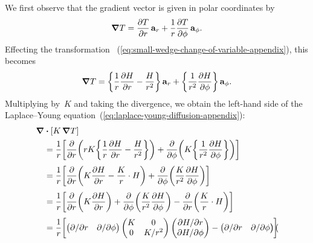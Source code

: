 We first observe that the gradient vector
is given in polar coordinates by
\begin{equation}
  \del T =
    \pder{T}{r} \basisvec{r} + \frac{1}{r} \pder{T}{\phi} \basisvec{\phi}.
  \label{eq:gradient-polar}
\end{equation}
Effecting the transformation~%
  (\ref{eq:small-wedge-change-of-variable-appendix}),
this becomes
\begin{equation}
  \del T =
    \curlybr*{\frac{1}{r} \pder{H}{r} - \frac{H}{r^2}} \basisvec{r}
      +
    \curlybr*{\frac{1}{r^2} \pder{H}{\phi}} \basisvec{\phi}.
  \label{eq:gradient-polar-change-of-variable}
\end{equation}
Multiplying by~$K$ and taking the divergence,
we obtain the left-hand side
of the Laplace--Young equation~(\ref{eq:laplace-young-diffusion-appendix}):
\begin{align*}
  \del & \dotp \squarebr{K \del T} \\
  &=
    \frac{1}{r} \squarebr*{
      \pder{}{r} \roundbr*{
        r K \curlybr*{\frac{1}{r} \pder{H}{r} - \frac{H}{r^2}}
      }
        +
      \pder{}{\phi} \roundbr*{
        K \curlybr*{\frac{1}{r^2} \pder{H}{\phi}}
      }
    }
    \\[\tallspace]
  &=
    \frac{1}{r} \squarebr*{
      \pder{}{r} \roundbr*{K \pder{H}{r} - \frac{K}{r} \cdot H}
        +
      \pder{}{\phi} \roundbr*{\frac{K}{r^2} \pder{H}{\phi}}
    }
    \\[\tallspace]
  &=
    \frac{1}{r} \squarebr*{
      \pder{}{r} \roundbr*{K \pder{H}{r}}
        +
      \pder{}{\phi} \roundbr*{\frac{K}{r^2} \pder{H}{\phi}}
        -
      \pder{}{r} \roundbr*{\frac{K}{r} \cdot H}
    }
    \\[\tallspace]
  &=
    \frac{1}{r} \squarebr*{
      \begin{pmatrix}
        \pd / {\pd r} & \pd / {\pd\phi}
      \end{pmatrix}
      \begin{pmatrix}
        K  &  0 \\
        0  &  K / r^2
      \end{pmatrix}
      \begin{pmatrix}
        \pd H / {\pd r} \\
        \pd H / {\pd\phi}
      \end{pmatrix}
        -
      \begin{pmatrix}
        \pd / {\pd r} & \pd / {\pd\phi}
      \end{pmatrix}
      \begin{pmatrix}

\end{pmatrix}}
\end{align*}
